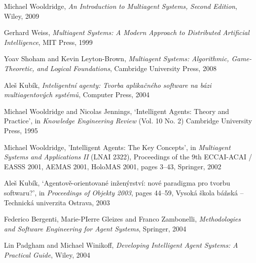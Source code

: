 \begin{thebibliography}{99}


Michael Wooldridge,
\textit{An Introduction to Multiagent Systems, Second Edition},
Wiley, 2009

Gerhard Weiss,
\textit{Multiagent Systems: A Modern Approach to Distributed Artificial Intelligence},
MIT Press, 1999

Yoav Shoham and Kevin Leyton-Brown,
\textit{Multiagent Systems: Algorithmic, Game-Theoretic, and Logical Foundations},
Cambridge University Press, 2008


Aleš Kubík,
\textit{Inteligentní agenty: Tvorba aplikačného software na bázi multiagentových systémů},
Computer Press, 2004

Michael Wooldridge and Nicolas Jennings,
`Intelligent Agents: Theory and Practice',
in \textit{Knowledge Engineering Review} (Vol. 10 No. 2)
Cambridge University Press, 1995

Michael Wooldridge,
'Intelligent Agents: The Key Concepts',
in \textit{Multiagent Systems and Applications II} (LNAI 2322),
Proceedings of the 9th ECCAI-ACAI / EASSS 2001, AEMAS 2001, HoloMAS 2001,
pages 3--43,
Springer, 2002 

Aleš Kubík,
`Agentově-orientované inženýrství: nové paradigma pro tvorbu softwaru?',
in \textit{Proceedings of Objekty 2003},
pages 44--59,
Vysoká škola báňská – Technická univerzita Ostrava, 2003


Federico Bergenti, Marie-PIerre Gleizes and Franco Zambonelli,
\textit{Methodologies and Software Engineering for Agent Systems},
Springer, 2004

Lin Padgham and Michael Winikoff,
\textit{Developing Intelligent Agent Systems: A Practical Guide},
Wiley, 2004



\end{thebibliography}
